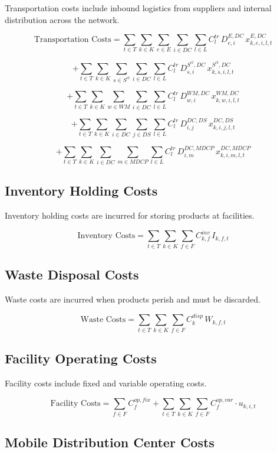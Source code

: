 \documentclass[12pt]{article}
\begin{document}
Transportation costs include inbound logistics from suppliers and internal distribution across the network.

\[
\text{Transportation Costs}
=
\sum_{t \in T} \sum_{k \in K} \sum_{e \in E} \sum_{i \in DC} \sum_{l \in L}
C^{tr}_l \, D^{E,DC}_{e,i} \, x^{E,DC}_{k,e,i,l,t}
\]

\[
+
\sum_{t \in T} \sum_{k \in K} \sum_{s \in S^{cl}} \sum_{i \in DC} \sum_{l \in L}
C^{tr}_l \, D^{S^{cl},DC}_{s,i} \, x^{S^{cl},DC}_{k,s,i,l,t}
\]

\[
+
\sum_{t \in T} \sum_{k \in K} \sum_{w \in WM} \sum_{i \in DC} \sum_{l \in L}
C^{tr}_l \, D^{WM,DC}_{w,i} \, x^{WM,DC}_{k,w,i,l,t}
\]

\[
+
\sum_{t \in T} \sum_{k \in K} \sum_{i \in DC} \sum_{j \in DS} \sum_{l \in L}
C^{tr}_l \, D^{DC,DS}_{i,j} \, x^{DC,DS}_{k,i,j,l,t}
\]

\[
+
\sum_{t \in T} \sum_{k \in K} \sum_{i \in DC} \sum_{m \in MDCP} \sum_{l \in L}
C^{tr}_l \, D^{DC,MDCP}_{i,m} \, x^{DC,MDCP}_{k,i,m,l,t}
\]

\subsection{Inventory Holding Costs}

Inventory holding costs are incurred for storing products at facilities.

\[
\text{Inventory Costs}
=
\sum_{t \in T} \sum_{k \in K} \sum_{f \in F}
C^{inv}_{k,f} \, I_{k,f,t}
\]

\subsection{Waste Disposal Costs}

Waste costs are incurred when products perish and must be discarded.

\[
\text{Waste Costs}
=
\sum_{t \in T} \sum_{k \in K} \sum_{f \in F}
C^{disp}_{k} \, W_{k,f,t}
\]

\subsection{Facility Operating Costs}

Facility costs include fixed and variable operating costs.

\[
\text{Facility Costs}
=
\sum_{f \in F} C^{op,fix}_f
+
\sum_{t \in T} \sum_{k \in K} \sum_{f \in F}
C^{op,var}_f \cdot u_{k,i,t}
\]

\subsection{Mobile Distribution Center Costs}
\end{document}
